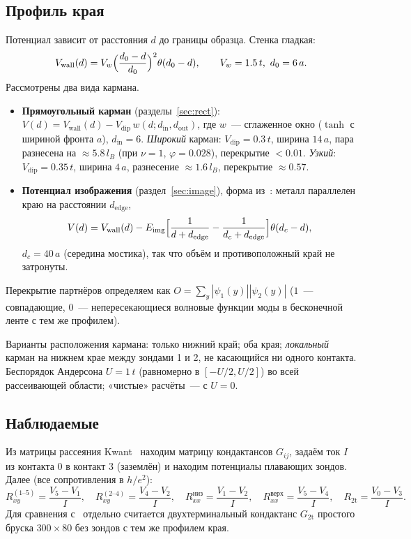 \documentclass[11pt,a4paper]{article}
\newcommand{\he}{h/e^2}
\newcommand{\Rxy}{R_{xy}}
\newcommand{\Rxx}{R_{xx}}
\newcommand{\lB}{l_B}
\begin{document}
\subsection{Профиль края}
Потенциал зависит от расстояния $d$ до границы образца. Стенка гладкая:
\[
V_\text{wall}(d)=V_w\Bigl(\frac{d_0-d}{d_0}\Bigr)^2\theta(d_0-d),\qquad
V_w=1.5\,t,\ d_0=6\,a .
\]
Рассмотрены два вида кармана.
\begin{itemize}
\item \textbf{Прямоугольный карман} (разделы~\ref{sec:rect}):
  $V(d)=V_\text{wall}(d)-V_\text{dip}\,w(d;d_\text{in},d_\text{out})$, где
  $w$~--- сглаженное окно ($\tanh$ с шириной фронта $a$), $d_\text{in}=6$.
  \emph{Широкий} карман: $V_\text{dip}=0.3\,t$, ширина $14\,a$, пара
  разнесена на $\approx5.8\,\lB$ (при $\nu=1$, $\varphi=0.028$), перекрытие
  $<0.01$. \emph{Узкий}: $V_\text{dip}=0.35\,t$, ширина $4\,a$, разнесение
  $\approx1.6\,\lB$, перекрытие $\approx0.57$.
\item \textbf{Потенциал изображения} (раздел~\ref{sec:image}), форма
  из~\cite{andolina}: металл параллелен краю на расстоянии $d_\text{edge}$,
  \begin{equation}\label{eq:img}
  V(d)=V_\text{wall}(d)-E_\text{img}\Bigl[\frac1{d+d_\text{edge}}-
  \frac1{d_c+d_\text{edge}}\Bigr]\theta(d_c-d),
  \end{equation}
  $d_c=40\,a$ (середина мостика), так что объём и противоположный край не
  затронуты.
\end{itemize}
Перекрытие партнёров определяем как $O=\sum_y|\psi_1(y)||\psi_2(y)|$
($1$~--- совпадающие, $0$~--- непересекающиеся волновые функции моды в
бесконечной ленте с тем же профилем).

Варианты расположения кармана: только нижний край; оба края; \emph{локальный}
карман на нижнем крае между зондами 1 и 2, не касающийся ни одного контакта.
Беспорядок Андерсона $U=1\,t$ (равномерно в $[-U/2,U/2]$) во всей
рассеивающей области; «чистые» расчёты~--- с $U=0$.

\subsection{Наблюдаемые}
Из матрицы рассеяния Kwant~\cite{kwant} находим матрицу кондактансов
$G_{ij}$, задаём ток $I$ из контакта 0 в контакт 3 (заземлён) и находим
потенциалы плавающих зондов. Далее (все сопротивления в $\he$):
\[
\Rxy^{(1\text{--}5)}=\frac{V_5-V_1}{I},\quad
\Rxy^{(2\text{--}4)}=\frac{V_4-V_2}{I},\quad
\Rxx^{\text{низ}}=\frac{V_1-V_2}{I},\quad
\Rxx^{\text{верх}}=\frac{V_5-V_4}{I},\quad
R_\text{2t}=\frac{V_0-V_3}{I}.
\]
Для сравнения с~\cite{andolina} отдельно считается двухтерминальный
кондактанс $G_\text{2t}$ простого бруска $300\times80$ без зондов с тем же
профилем края.
\end{document}
